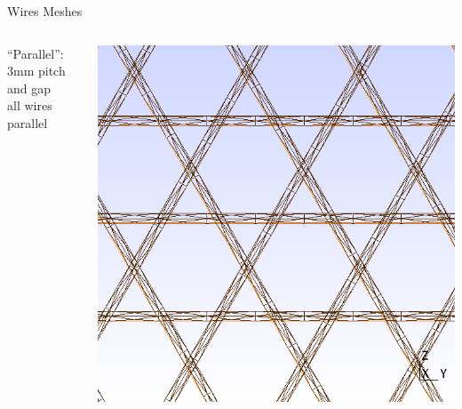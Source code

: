 \documentclass[xcolor=dvipsnames]{beamer}
\begin{document}
\begin{frame}{Wires Meshes}
\begin{columns}
\begin{column}{0.3\textwidth}
\begin{center}
        ``Parallel'':\\3mm pitch and gap\\all wires parallel
      \end{center}
    \end{column}
    \begin{column}{0.3\textwidth}
      \begin{center}
        \includegraphics[height=0.4\textheight]{uboone-mesh.png}      


\end{center}
\end{column}
\end{columns}
\end{frame}
\end{document}
